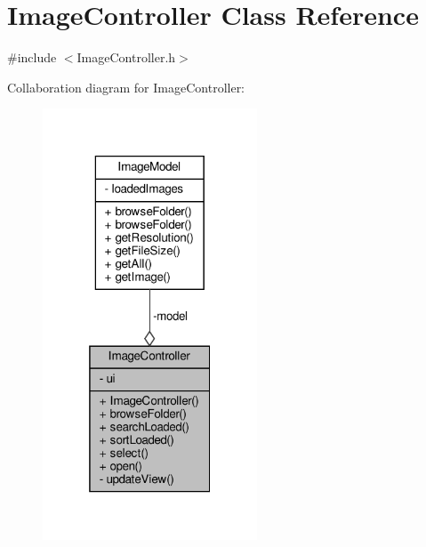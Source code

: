 \hypertarget{classImageController}{}\section{Image\+Controller Class Reference}
\label{classImageController}


{\ttfamily \#include $<$Image\+Controller.\+h$>$}



Collaboration diagram for Image\+Controller\+:
\nopagebreak
\begin{figure}[H]
\begin{center}
\leavevmode
\includegraphics[width=181pt]{classImageController__coll__graph}
\end{center}
\end{figure}
